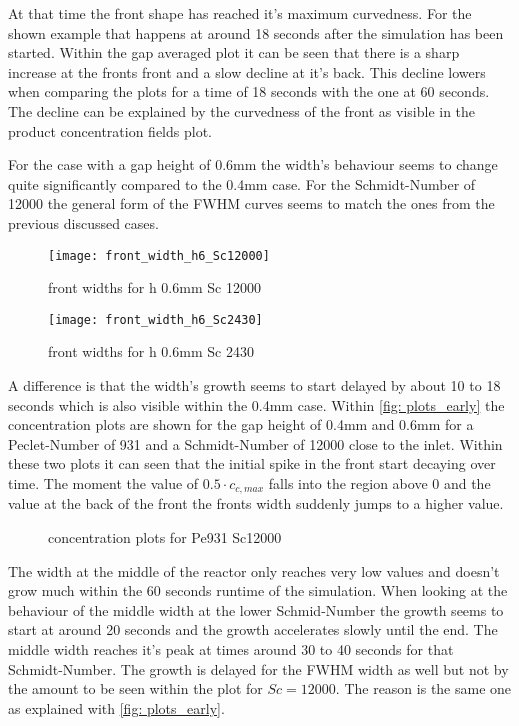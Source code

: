 \documentclass[../thesis.tex]{subfiles}
\begin{document}
At that time the front shape has reached it's maximum curvedness. For the shown example that happens at around 18 seconds after the simulation has been started. Within the gap averaged plot it can be seen that there is a sharp increase at the fronts front and a slow decline at it's back. This decline lowers when comparing the plots for a time of 18 seconds with the one at 60 seconds. The decline can be explained by the curvedness of the front as visible in the product concentration fields plot.
\newline

For the case with a gap height of 0.6mm the width's behaviour seems to change quite significantly compared to the 0.4mm case. For the Schmidt-Number of 12000 the general form of the FWHM curves seems to match the ones from the previous discussed cases.
\begin{figure}[htbp]
	\centering
	\texttt{[image: front\_width\_h6\_Sc12000]}
	\caption{front widths for h 0.6mm Sc 12000\label{fig: front_width_h6_Sc12000}}\bigskip
	\texttt{[image: front\_width\_h6\_Sc2430]}
	\caption{front widths for h 0.6mm Sc 2430\label{fig: front_width_pos_h6_Sc2430}}
\end{figure}
A difference is that the width's growth seems to start delayed by about 10 to 18 seconds which is also visible within the 0.4mm case. Within \autoref{fig: plots_early} the concentration plots are shown for the gap height of 0.4mm and 0.6mm for a Peclet-Number of 931 and a Schmidt-Number of 12000 close to the inlet. Within these two plots it can seen that the initial spike in the front start decaying over time. The moment the value of $0.5 \cdot c_{c,max}$ falls into the region above 0 and the value at the back of the front the fronts width suddenly jumps to a higher value.
\begin{figure}[htb]
	\centering
	\qquad
	\caption{concentration plots for Pe931 Sc12000}%
	\label{fig: plots_early}%
\end{figure}
The width at the middle of the reactor only reaches very low values and doesn't grow much within the 60 seconds runtime of the simulation. When looking at the behaviour of the middle width at the lower Schmid-Number the growth seems to start at around 20 seconds and the growth accelerates slowly until the end. The middle width reaches it's peak at times around 30 to 40 seconds for that Schmidt-Number. The growth is delayed for the FWHM width as well but not by the amount to be seen within the plot for $Sc = 12000$. The reason is the same one as explained with \autoref{fig: plots_early}.
\end{document}
